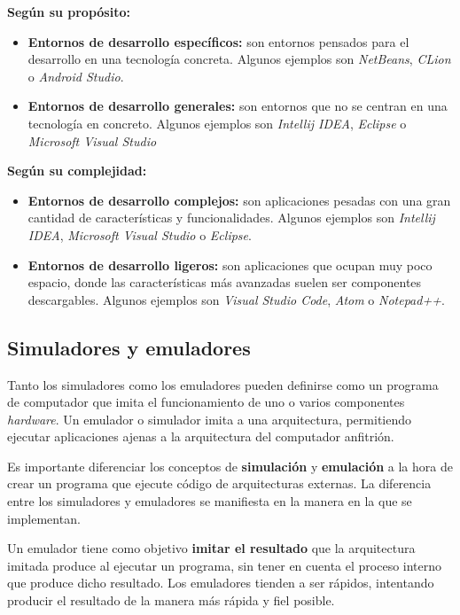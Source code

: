 \textbf{Según su propósito:}
\begin{itemize}
    \item \textbf{Entornos de desarrollo específicos:} son entornos pensados para el desarrollo en una
    tecnología concreta.
    Algunos ejemplos son \textit{NetBeans}, \textit{CLion} o \textit{Android Studio}.
    \item \textbf{Entornos de desarrollo generales:} son entornos que no se centran en una tecnología en concreto.
    Algunos ejemplos son \textit{Intellij IDEA}\cite{INTELLIJIDEA},
    \textit{Eclipse}\cite{ECLIPSE} o \textit{Microsoft Visual Studio}\cite{VISUALSTUDIO}
\end{itemize}

\textbf{Según su complejidad:}
\begin{itemize}
    \item \textbf{Entornos de desarrollo complejos:} son aplicaciones pesadas con una gran cantidad de
    características y funcionalidades.
    Algunos ejemplos son \textit{Intellij IDEA},
    \textit{Microsoft Visual Studio} o \textit{Eclipse}.
    \item \textbf{Entornos de desarrollo ligeros:} son aplicaciones que ocupan muy poco espacio, donde
    las características más avanzadas suelen ser componentes descargables.
    Algunos ejemplos son \textit{Visual Studio Code}\cite{VISUALSTUDIOCODE},
    \textit{Atom}\cite{ATOM} o \textit{Notepad++}\cite{NOTEPADPP}.
\end{itemize}

\subsection{Simuladores y emuladores}
\label{subsec:simuladores-y-emuladores}

Tanto los simuladores como los emuladores pueden definirse como un
programa de computador que imita el funcionamiento de uno o varios
componentes \textit{hardware}.
Un emulador o simulador imita a una arquitectura, permitiendo
ejecutar aplicaciones ajenas a la arquitectura del computador anfitrión.

Es importante diferenciar los conceptos de \textbf{simulación}
y \textbf{emulación} a la hora de crear un programa que ejecute
código de arquitecturas externas.
La diferencia entre los simuladores y emuladores se manifiesta
en la manera en la que se implementan.

Un emulador tiene como objetivo \textbf{imitar el resultado}
que la arquitectura imitada produce al ejecutar un programa, sin tener
en cuenta el proceso interno que produce dicho resultado.
Los emuladores tienden a ser rápidos, intentando producir el resultado
de la manera más rápida y fiel posible.

